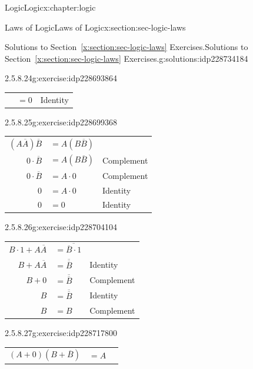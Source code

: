 \documentclass[twoside,10pt,]{book}
\newcommand{\tabularfont}{\relax}
\newcommand{\xreffont}{\relax}
\numberwithin{equation}{section}
\begin{document}
\begin{chapterptx}{Logic}{}{Logic}{}{}{x:chapter:logic}
\begin{sectionptx}{Laws of Logic}{}{Laws of Logic}{}{}{x:section:sec-logic-laws}
\begin{solutions-subsection}{Solutions to Section~{\xreffont\ref*{x:section:sec-logic-laws}} Exercises.}{}{Solutions to Section~{\xreffont\ref*{x:section:sec-logic-laws}} Exercises.}{}{}{g:solutions:idp228734184}
\begin{exercisegroup}
\begin{divisionsolutioneg}{2.5.8.24}{}{g:exercise:idp228693864}
\begin{center}
{\begin{tabular}{lll}
&\(=0\)&Identity
\end{tabular}
}%
\end{center}%
\end{divisionsolutioneg}%
\end{exercisegroup}
\par\medskip\noindent
\begin{exercisegroup}
\begin{divisionsolutioneg}{2.5.8.25}{}{g:exercise:idp228699368}%
\par\smallskip%
\noindent\hypertarget{g:solution:idp228699496-main}{}\begin{center}%
{\tabularfont%
\begin{tabular}{lll}
\multicolumn{1}{r}{\((A\overline{A})\overline{B}\)}&\(=A(B\overline{B})\)&\tabularnewline[0pt]
\multicolumn{1}{r}{\(0\cdot\overline{B}\)}&\(=A(B\overline{B})\)&Complement\tabularnewline[0pt]
\multicolumn{1}{r}{\(0\cdot\overline{B}\)}&\(=A\cdot 0\)&Complement\tabularnewline[0pt]
\multicolumn{1}{r}{\(0\)}&\(=A\cdot 0\)&Identity\tabularnewline[0pt]
\multicolumn{1}{r}{\(0\)}&\(=0\)&Identity
\end{tabular}
}%
\end{center}%
\end{divisionsolutioneg}%
\begin{divisionsolutioneg}{2.5.8.26}{}{g:exercise:idp228704104}%
\par\smallskip%
\noindent\hypertarget{g:solution:idp228705000-main}{}\begin{center}%
{\tabularfont%
\begin{tabular}{lll}
\multicolumn{1}{r}{\(B\cdot 1+A\overline{A}\)}&\(=\overline{\overline{B}\cdot 1}\)&\tabularnewline[0pt]
\multicolumn{1}{r}{\(B+A\overline{A}\)}&\(=\overline{\overline{B}}\)&Identity\tabularnewline[0pt]
\multicolumn{1}{r}{\(B+0\)}&\(=\overline{\overline{B}}\)&Complement\tabularnewline[0pt]
\multicolumn{1}{r}{\(B\)}&\(=\overline{\overline{B}}\)&Identity\tabularnewline[0pt]
\multicolumn{1}{r}{\(B\)}&\(=B\)&Complement
\end{tabular}
}%
\end{center}%
\end{divisionsolutioneg}%
\begin{divisionsolutioneg}{2.5.8.27}{}{g:exercise:idp228717800}%
\par\smallskip%
\noindent\hypertarget{g:solution:idp228712680-main}{}\begin{center}%
{\tabularfont%
\begin{tabular}{lll}
\multicolumn{1}{r}{\((A+0)(B+\overline{B})\)}&\(=A\)&\tabularnewline[0pt]

\end{tabular}}
\end{center}
\end{divisionsolutioneg}
\end{exercisegroup}
\end{solutions-subsection}
\end{sectionptx}
\end{chapterptx}
\end{document}

